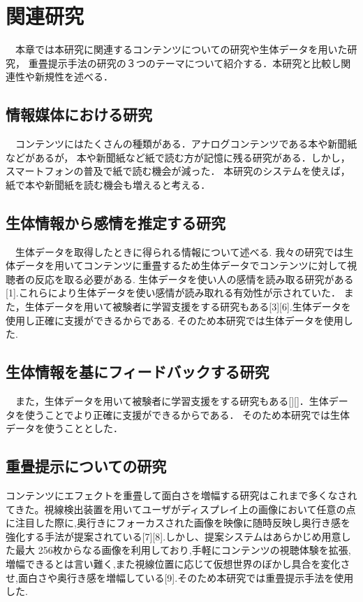 \thispagestyle{myheadings}
\chapter{関連研究}
　本章では本研究に関連するコンテンツについての研究や生体データを用いた研究，
重畳提示手法の研究の３つのテーマについて紹介する．本研究と比較し関連性や新規性を述べる．

\section{情報媒体における研究}
　コンテンツにはたくさんの種類がある．アナログコンテンツである本や新聞紙などがあるが，
本や新聞紙など紙で読む方が記憶に残る研究がある．しかし，スマートフォンの普及で紙で読む機会が減った．
本研究のシステムを使えば，紙で本や新聞紙を読む機会も増えると考える．

\section{生体情報から感情を推定する研究}

　生体データを取得したときに得られる情報について述べる.
我々の研究では生体データを用いてコンテンツに重畳するため生体データでコンテンツに対して視聴者の反応を取る必要がある.
生体データを使い人の感情を読み取る研究がある[1].これらにより生体データを使い感情が読み取れる有効性が示されていた．
また，生体データを用いて被験者に学習支援をする研究もある[3][6].生体データを使用し正確に支援ができるからである.
そのため本研究では生体データを使用した.

\section{生体情報を基にフィードバックする研究}
　また，生体データを用いて被験者に学習支援をする研究もある[][]．生体データを使うことでより正確に支援ができるからである．
そのため本研究では生体データを使うこととした．

\section{重畳提示についての研究}
コンテンツにエフェクトを重畳して面白さを増幅する研究はこれまで多くなされてきた。視線検出装置を用いてユーザがディスプレイ上の画像において任意の点に注目した際に,奥行きにフォーカスされた画像を映像に随時反映し奥行き感を強化する手法が提案されている[7][8].しかし、提案システムはあらかじめ用意した最大 256枚からなる画像を利用しており,手軽にコンテンツの視聴体験を拡張,増幅できるとは言い難く,また視線位置に応じて仮想世界のぼかし具合を変化させ,面白さや奥行き感を増幅している[9].そのため本研究では重畳提示手法を使用した.

